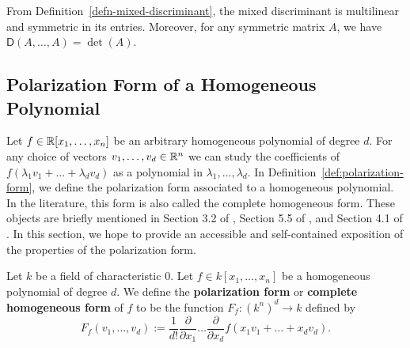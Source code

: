\documentclass{puthesis-UG}
\begin{document}
From Definition~\ref{defn-mixed-discriminant}, the mixed discriminant is multilinear and symmetric in its entries. Moreover, for any symmetric matrix $A$, we have $\mathsf{D}(A, \ldots, A) = \det (A)$. 

\subsection{Polarization Form of a Homogeneous Polynomial} \label{sec:polarization-form}

Let $f \in \mathbb{R}[x_1, \ldots, x_n]$ be an arbitrary homogeneous polynomial of degree $d$. For any choice of vectors $v_1, \ldots, v_d \in \mathbb{R}^n$ we can study the coefficients of $f(\lambda_1 v_1 + \ldots + \lambda_d v_d)$ as a polynomial in $\lambda_1, \ldots, \lambda_d$. In Definition~\ref{def:polarization-form}, we define the polarization form associated to a homogeneous polynomial. In the literature, this form is also called the complete homogeneous form. These objects are briefly mentioned in Section 3.2 of \cite{lie-groups}, Section 5.5 of \cite{schneider_2013}, and Section 4.1 of \cite{lorentzian-polynomials}. In this section, we hope to provide an accessible and self-contained exposition of the properties of the polarization form.

\begin{defn} \label{def:polarization-form}
	Let $k$ be a field of characteristic $0$. Let $f \in k[x_1, \ldots, x_n]$ be a homogeneous polynomial of degree $d$. We define the \textbf{polarization form} or \textbf{complete homogeneous form} of $f$ to be the function $F_f : (k^n)^d \to k$ defined by 
	\[
		F_f (v_1, \ldots, v_d) := \frac{1}{d!} \frac{\partial}{\partial x_1} \ldots \frac{\partial}{\partial x_d} f(x_1 v_1 + \ldots + x_d v_d).
	\] 
\end{defn}
\end{document}
